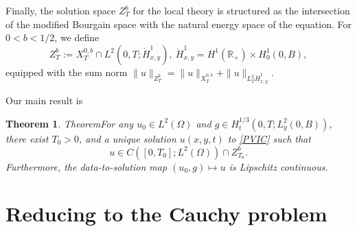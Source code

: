 \documentclass[11pt]{article}
\numberwithin{equation}{section}
\newtheorem{theorem}{Theorem}
\begin{document}
Finally, the solution space $Z^b_T$ for the local theory is structured as the intersection of the modified Bourgain space with the natural energy space of the equation. For $0< b < 1/2$, we define
\begin{equation}
Z^b_{T} := X^{0,b}_T \cap L^2(0,T; \dot{H}^1_{x,y}),\ \dot{H}^{1}_{x,y}=H^{1}(\mathbb{R}_{+})\times H^{1}_{0}(0,B),\end{equation}
equipped with the sum norm $\|u\|_{Z^b_T} = \|u\|_{X^{0,b}_T} + \|u\|_{L^2_T \dot{H}^1_{x,y}}$.

Our main result is

\begin{theorem}{Theorem}\label{Localwellposedness}
For any $u_{0}\in L^{2}(\Omega)$ and $g\in H^{1/3}_{t}(0,T; L^{2}_{y}(0,B))$, there exist $T_{0}>0$, and a unique solution $u(x,y,t)$ to \eqref{PVIC} such that
\begin{equation*}
u\in C([0,T_{0}];L^{2}(\Omega))\cap Z^{b}_{T_{0}}.
\end{equation*}
Furthermore, the data-to-solution map $(u_{0},g) \mapsto u$ is Lipschitz continuous.
\end{theorem}

\section{Reducing to the Cauchy problem}
\end{document}
